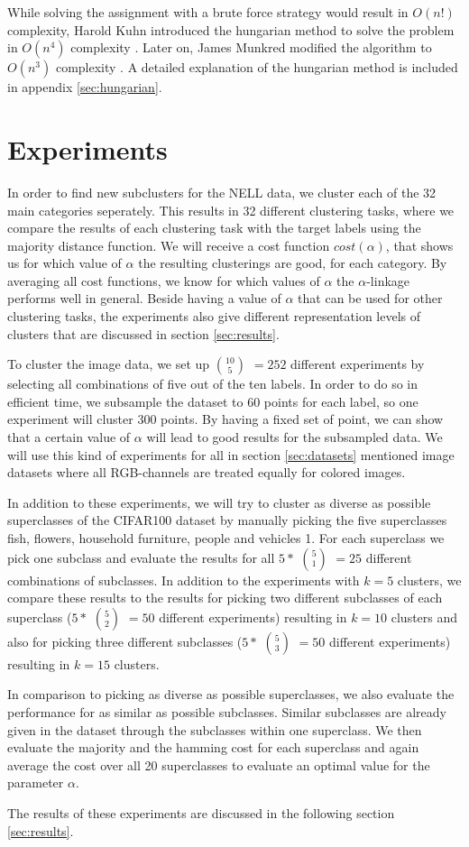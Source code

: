 While solving the assignment with a brute force strategy would result in $O(n!)$ complexity, Harold Kuhn introduced the hungarian method to solve the problem in $O(n^4)$ complexity \cite{kuhn1955hungarian}. Later on, James Munkred modified the algorithm to $O(n^3)$ complexity \cite{munkres1957algorithms}. A detailed explanation of the hungarian method is included in appendix \ref{sec:hungarian}.

\section{Experiments}

In order to find new subclusters for the NELL data, we cluster each of the 32 main categories seperately. This results in 32 different clustering tasks, where we compare the results of each clustering task with the target labels using the majority distance function. We will receive a cost function $cost(\alpha)$, that shows us for which value of $\alpha$ the resulting clusterings are good, for each category. By averaging all cost functions, we know for which values of $\alpha$ the $\alpha$-linkage performs well in general. Beside having a value of $\alpha$ that can be used for other clustering tasks, the experiments also give different representation levels of clusters that are discussed in section \ref{sec:results}.

To cluster the image data, we set up $10 \choose 5$ $= 252$ different experiments by selecting all combinations of five out of the ten labels. In order to do so in efficient time, we subsample the dataset to 60 points for each label, so one experiment will cluster 300 points. By having a fixed set of point, we can show that a certain value of $\alpha$ will lead to good results for the subsampled data. We will use this kind of experiments for all in section \ref{sec:datasets} mentioned image datasets where all RGB-channels are treated equally for colored images.

In addition to these experiments, we will try to cluster as diverse as possible superclasses of the CIFAR100 dataset by manually picking the five superclasses fish, flowers, household furniture, people and vehicles 1. For each superclass we pick one subclass and evaluate the results for all $5 *$ $5 \choose 1$ $= 25$ different combinations of subclasses. In addition to the experiments with $k = 5$ clusters, we compare these results to the results for picking two different subclasses of each superclass ($5 *$ $5 \choose 2$ $= 50$ different experiments) resulting in $k = 10$ clusters and also for picking three different subclasses ($5 *$ $5 \choose 3$ $= 50$ different experiments) resulting in $k = 15$ clusters.

In comparison to picking as diverse as possible superclasses, we also evaluate the performance for as similar as possible subclasses. Similar subclasses are already given in the dataset through the subclasses within one superclass. We then evaluate the majority and the hamming cost for each superclass and again average the cost over all 20 superclasses to evaluate an optimal value for the parameter $\alpha$.

The results of these experiments are discussed in the following section \ref{sec:results}.